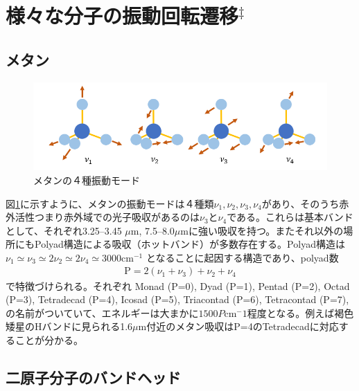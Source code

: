 \section{様々な分子の振動回転遷移$^\ddagger$}
\subsection*{メタン}

\begin{figure}
    \centering
    \includegraphics[width=\linewidth]{fig/methanevib.png}
    \caption{メタンの４種振動モード}
    \label{fig:ch4vib}
\end{figure}

図\ref{fig:ch4vib}に示すように、メタンの振動モードは４種類$\nu_1, \nu_2, \nu_3, \nu_4$があり、そのうち赤外活性つまり赤外域での光子吸収があるのは$\nu_3$と$\nu_4$である。これらは基本バンドとして、それぞれ3.25--3.45 $\mu$m, 7.5--8.0$\mu$mに強い吸収を持つ。またそれ以外の場所にもPolyad構造による吸収（ホットバンド）が多数存在する。Polyad構造は
$\nu_1 \simeq \nu_3 \simeq 2 \nu_2 \simeq 2 \nu_4 \simeq 3000\mathrm{cm}^{-1}$ となることに起因する構造であり、polyad数
\begin{align}
\mathrm{P} =  2 (\nu_1 + \nu_3) + \nu_2 + \nu_4 
\end{align}
で特徴づけられる。それぞれ
Monad (P=0),
Dyad (P=1),
Pentad (P=2),
Octad (P=3),
Tetradecad (P=4),
Icosad (P=5),
Triacontad (P=6),
Tetracontad (P=7),
の名前がついていて、エネルギーは大まかに$1500 P \mathrm{cm}^-1$程度となる。例えば褐色矮星のHバンドに見られる1.6$\mu$m付近のメタン吸収はP=4のTetradecadに対応することが分かる\cite{2024JQSRT.31608897K}。\\


\subsection*{二原子分子のバンドヘッド}

